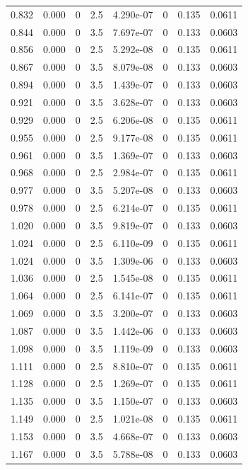 \documentclass[preview]{standalone}
\begin{document}
{{{\begin{tabular}{L{1.2cm}C{1.2cm} C{0.3cm}C{0.5cm} C{1.4cm}C{1.4cm} C{1.4cm}C{1.4cm}}
  0.832  &  0.000  & 0     & 2.5 &  4.290e-07  & 0  & 0.135 &  0.0611   \\ 
  0.844  &  0.000  & 0     & 3.5 &  7.697e-07  & 0  & 0.133 &  0.0603   \\ 
  0.856  &  0.000  & 0     & 2.5 &  5.292e-08  & 0  & 0.135 &  0.0611   \\ 
  0.867  &  0.000  & 0     & 3.5 &  8.079e-08  & 0  & 0.133 &  0.0603   \\ 
  0.894  &  0.000  & 0     & 3.5 &  1.439e-07  & 0  & 0.133 &  0.0603   \\ 
  0.921  &  0.000  & 0     & 3.5 &  3.628e-07  & 0  & 0.133 &  0.0603   \\ 
  0.929  &  0.000  & 0     & 2.5 &  6.206e-08  & 0  & 0.135 &  0.0611   \\ 
  0.955  &  0.000  & 0     & 2.5 &  9.177e-08  & 0  & 0.135 &  0.0611   \\ 
  0.961  &  0.000  & 0     & 3.5 &  1.369e-07  & 0  & 0.133 &  0.0603   \\ 
  0.968  &  0.000  & 0     & 2.5 &  2.984e-07  & 0  & 0.135 &  0.0611   \\ 
  0.977  &  0.000  & 0     & 3.5 &  5.207e-08  & 0  & 0.133 &  0.0603   \\ 
  0.978  &  0.000  & 0     & 2.5 &  6.214e-07  & 0  & 0.135 &  0.0611   \\ 
  1.020  &  0.000  & 0     & 3.5 &  9.819e-07  & 0  & 0.133 &  0.0603   \\ 
  1.024  &  0.000  & 0     & 2.5 &  6.110e-09  & 0  & 0.135 &  0.0611   \\ 
  1.024  &  0.000  & 0     & 3.5 &  1.309e-06  & 0  & 0.133 &  0.0603   \\ 
  1.036  &  0.000  & 0     & 2.5 &  1.545e-08  & 0  & 0.135 &  0.0611   \\ 
  1.064  &  0.000  & 0     & 2.5 &  6.141e-07  & 0  & 0.135 &  0.0611   \\ 
  1.069  &  0.000  & 0     & 3.5 &  3.200e-07  & 0  & 0.133 &  0.0603   \\ 
  1.087  &  0.000  & 0     & 3.5 &  1.442e-06  & 0  & 0.133 &  0.0603   \\ 
  1.098  &  0.000  & 0     & 3.5 &  1.119e-09  & 0  & 0.133 &  0.0603   \\ 
  1.111  &  0.000  & 0     & 2.5 &  8.810e-07  & 0  & 0.135 &  0.0611   \\ 
  1.128  &  0.000  & 0     & 2.5 &  1.269e-07  & 0  & 0.135 &  0.0611   \\ 
  1.135  &  0.000  & 0     & 3.5 &  1.150e-07  & 0  & 0.133 &  0.0603   \\ 
  1.149  &  0.000  & 0     & 2.5 &  1.021e-08  & 0  & 0.135 &  0.0611   \\ 
  1.153  &  0.000  & 0     & 3.5 &  4.668e-07  & 0  & 0.133 &  0.0603   \\ 
  1.167  &  0.000  & 0     & 3.5 &  5.788e-08  & 0  & 0.133 &  0.0603   \\ 
\hline 
\end{tabular} 

}}}
\end{document}
